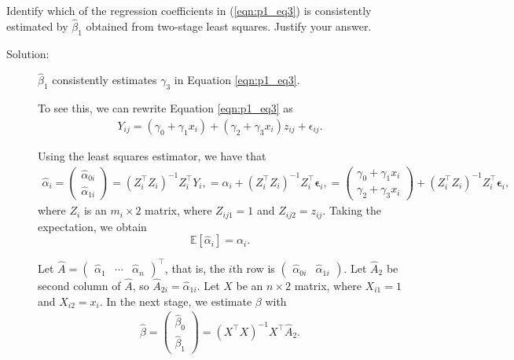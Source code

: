 \documentclass[11pt, letterpaper]{article}
\begin{document}
\begin{enumerate}[(a)]
  {\em \item Identify which of the regression coefficients in (\ref{eqn:p1_eq3}) is consistently estimated by $\hat{\beta}_1$ obtained from two-stage least squares.  Justify your answer.}

  \begin{description}
  \item[Solution:] $\hat{\beta}_1$ consistently estimates $\gamma_3$ in Equation    
    \ref{eqn:p1_eq3}.

    To see this, we can rewrite Equation \ref{eqn:p1_eq3} as
    \begin{align*}
      Y_{ij} = \left(\gamma_0 + \gamma_1x_i\right) + \left(\gamma_2 + \gamma_3x_i\right)z_{ij} + \epsilon_{ij}.
    \end{align*}
    
    Using the least squares estimator, we have that
    \begin{align*}
      \hat{\alpha}_i = \begin{pmatrix}
        \hat{\alpha}_{0i} \\
        \hat{\alpha}_{1i}
      \end{pmatrix}
      = \left(Z_i^\intercal Z_i\right)^{-1}Z_i^\intercal Y_{i},
      = \alpha_i + \left(Z_i^\intercal Z_i\right)^{-1}Z_i^\intercal{\bm\epsilon}_{i},
      = \begin{pmatrix}
        \gamma_0 + \gamma_1x_i \\
        \gamma_2 + \gamma_3x_i        
      \end{pmatrix}
      + \left(Z_i^\intercal Z_i\right)^{-1}Z_i^\intercal{\bm\epsilon}_{i},
    \end{align*}
    where $Z_i$ is an $m_i \times 2$ matrix, where $Z_{ij1} = 1$ and
    $Z_{ij2} = z_{ij}$.  Taking the expectation, we obtain
    \begin{equation}
      \mathbb{E}\left[\hat{\alpha}_i\right] = \alpha_i.
    \end{equation}

    Let $\hat{A} = \begin{pmatrix} \hat{\alpha}_1 & \cdots & \hat{\alpha}_n
    \end{pmatrix}^\intercal$, that is, the $i$th row is
    $\begin{pmatrix} \hat{\alpha}_{0i} & \hat{\alpha}_{1i}\end{pmatrix}$.  Let
    $\hat{A}_2$ be second column of $\hat{A}$, so
    $\hat{A}_{2i} = \hat{\alpha}_{1i}$. Let $X$ be an $n \times 2$ matrix, where
    $X_{i1} = 1$ and $X_{i2} = x_{i}$. In the next stage, we estimate $\beta$
    with
    \begin{align*}
      \hat{\beta} = \begin{pmatrix}
        \hat{\beta}_0 \\ \hat{\beta}_1
      \end{pmatrix}
      = \left(X^\intercal X\right)^{-1}X^\intercal\hat{A}_2.
    \end{align*}


\end{description}
\end{enumerate}
\end{document}
